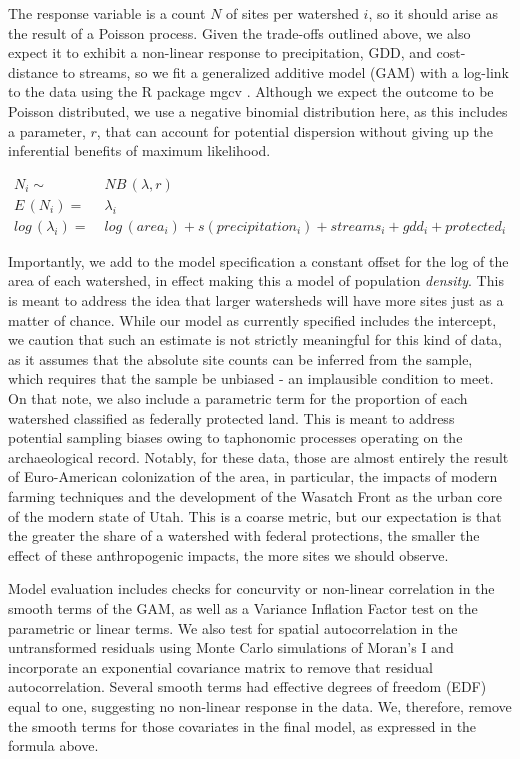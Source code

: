 \documentclass[
  number,
  preprint,
  3p]{elsarticle}
\begin{document}
The response variable is a count \(N\) of sites per watershed \(i\), so
it should arise as the result of a Poisson process. Given the trade-offs
outlined above, we also expect it to exhibit a non-linear response to
precipitation, GDD, and cost-distance to streams, so we fit a
generalized additive model (GAM) with a log-link to the data using the R
package mgcv \citep{wood2004}. Although we expect the outcome to be
Poisson distributed, we use a negative binomial distribution here, as
this includes a parameter, \(r\), that can account for potential
dispersion without giving up the inferential benefits of maximum
likelihood.

\[
\begin{aligned}
N_i \sim& \;NB\,(\lambda, r)\\
E\,(N_i) =& \;\lambda_i\\
log\, (\lambda_i) =& \;log\, (area_i) + s(precipitation_i) + streams_i + gdd_i + protected_i
\end{aligned}
\]

Importantly, we add to the model specification a constant offset for the
log of the area of each watershed, in effect making this a model of
population \emph{density}. This is meant to address the idea that larger
watersheds will have more sites just as a matter of chance. While our
model as currently specified includes the intercept, we caution that
such an estimate is not strictly meaningful for this kind of data, as it
assumes that the absolute site counts can be inferred from the sample,
which requires that the sample be unbiased - an implausible condition to
meet. On that note, we also include a parametric term for the proportion
of each watershed classified as federally protected land. This is meant
to address potential sampling biases owing to taphonomic processes
operating on the archaeological record. Notably, for these data, those
are almost entirely the result of Euro-American colonization of the
area, in particular, the impacts of modern farming techniques and the
development of the Wasatch Front as the urban core of the modern state
of Utah. This is a coarse metric, but our expectation is that the
greater the share of a watershed with federal protections, the smaller
the effect of these anthropogenic impacts, the more sites we should
observe.

Model evaluation includes checks for concurvity or non-linear
correlation in the smooth terms of the GAM, as well as a Variance
Inflation Factor test on the parametric or linear terms. We also test
for spatial autocorrelation in the untransformed residuals using Monte
Carlo simulations of Moran's I and incorporate an exponential covariance
matrix to remove that residual autocorrelation. Several smooth terms had
effective degrees of freedom (EDF) equal to one, suggesting no
non-linear response in the data. We, therefore, remove the smooth terms
for those covariates in the final model, as expressed in the formula
above.
\end{document}
